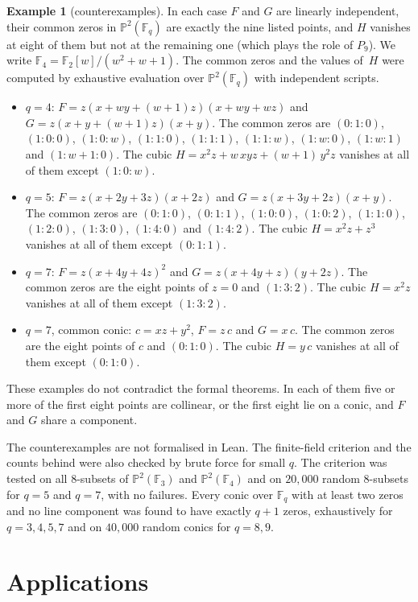 \documentclass[11pt]{article}
\theoremstyle{definition}
\newtheorem{example}[theorem]{Example}
\theoremstyle{remark}
\newcommand{\F}{\mathbb{F}}
\newcommand{\PP}{\mathbb{P}}
\begin{document}
\begin{example}[counterexamples]\label{ex:counter}
In each case $F$ and $G$ are linearly independent, their common zeros in $\PP^2(\F_q)$ are
exactly the nine listed points, and $H$ vanishes at eight of them but not at the remaining one
(which plays the role of $P_9$). We write
$\F_4=\F_2[w]/(w^2+w+1)$. The common zeros and the values of~$H$ were computed by exhaustive
evaluation over $\PP^2(\F_q)$ with independent scripts.
\begin{itemize}
\item $q=4$: $F=z(x+wy+(w+1)z)(x+wy+wz)$ and $G=z(x+y+(w+1)z)(x+y)$. The common zeros are
$(0:1:0)$, $(1:0:0)$, $(1:0:w)$, $(1:1:0)$, $(1:1:1)$, $(1:1:w)$, $(1:w:0)$, $(1:w:1)$ and
$(1:w{+}1:0)$. The cubic $H=x^2z+w\,xyz+(w+1)\,y^2z$ vanishes at all of them except $(1:0:w)$.
\item $q=5$: $F=z(x+2y+3z)(x+2z)$ and $G=z(x+3y+2z)(x+y)$. The common zeros are $(0:1:0)$,
$(0:1:1)$, $(1:0:0)$, $(1:0:2)$, $(1:1:0)$, $(1:2:0)$, $(1:3:0)$, $(1:4:0)$ and $(1:4:2)$. The
cubic $H=x^2z+z^3$ vanishes at all of them except $(0:1:1)$.
\item $q=7$: $F=z(x+4y+4z)^2$ and $G=z(x+4y+z)(y+2z)$. The common zeros are the eight points of
$z=0$ and $(1:3:2)$. The cubic $H=x^2z$ vanishes at all of them except $(1:3:2)$.
\item $q=7$, common conic: $c=xz+y^2$, $F=z\,c$ and $G=x\,c$. The common zeros are the eight points
of $c$ and $(0:1:0)$. The cubic $H=y\,c$ vanishes at all of them except $(0:1:0)$.
\end{itemize}
These examples do not contradict the formal theorems. In each of them five or more of the first
eight points are collinear, or the first eight lie on a conic, and $F$ and $G$ share a component.
\end{example}

The counterexamples are not formalised in Lean. The finite-field criterion and the counts behind
 were also checked by brute force for small $q$. The criterion was tested on
all $8$-subsets of $\PP^2(\F_3)$ and $\PP^2(\F_4)$ and on $20{,}000$ random $8$-subsets for $q=5$
and $q=7$, with no failures. Every conic over $\F_q$ with at least two zeros and no line
component was found to have exactly $q+1$ zeros, exhaustively for $q=3,4,5,7$ and on $40{,}000$
random conics for $q=8,9$.

\section{Applications}\label{sec:apps}
\end{document}
